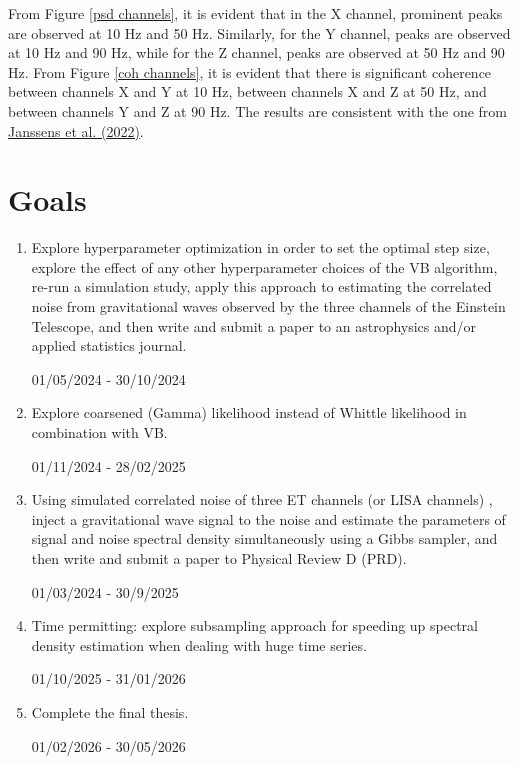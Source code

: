 \documentclass[12pt,a4paper]{article}
\begin{document}
From Figure \ref{psd channels}, it is evident that in the X channel, prominent peaks are observed at 10 Hz and 50 Hz. Similarly, for the Y channel, peaks are observed at 10 Hz and 90 Hz, while for the Z channel, peaks are observed at 50 Hz and 90 Hz. From Figure \ref{coh channels}, it is evident that there is significant coherence between channels X and Y at 10 Hz, between channels X and Z at 50 Hz, and between channels Y and Z at 90 Hz. The results are consistent with the one from \hyperref[janssens2022]{Janssens et al. (2022)}. 





\section{Goals}
\begin{enumerate}
    \item Explore hyperparameter optimization in order to set the optimal step size, explore the effect of any other hyperparameter choices of the VB algorithm, re-run a simulation study, apply this approach to estimating the correlated noise from gravitational waves observed by the three channels of the Einstein Telescope, and then write and submit a paper to an astrophysics and/or applied statistics journal. 
    
    01/05/2024 - 30/10/2024
    
    \item Explore coarsened (Gamma) likelihood instead of Whittle likelihood in combination with VB.

    01/11/2024 - 28/02/2025

    \item Using  simulated correlated noise of three ET channels (or LISA channels) , inject a gravitational wave signal to the noise and estimate the parameters of signal and noise spectral density simultaneously using a Gibbs sampler, and then write and submit a paper to Physical Review D (PRD).
    
    01/03/2024 - 30/9/2025

    \item Time permitting: explore subsampling approach for speeding up spectral density estimation when dealing with huge time series.

    01/10/2025 - 31/01/2026

    \item Complete the final thesis.

    01/02/2026 - 30/05/2026
\end{enumerate}
\end{document}
